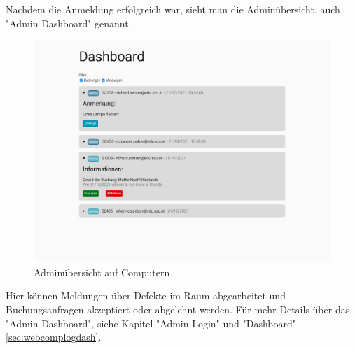 Nachdem die Anmeldung erfolgreich war, sieht man die Adminübersicht, auch "Admin Dashboard" genannt.

\begin{figure}[H]
    \centering
    \includegraphics[width=120mm]{media/WebComponents/AdminSeite_light.png}
    \caption{Adminübersicht auf Computern}
\end{figure}

Hier können Meldungen über Defekte im Raum abgearbeitet und Buchungsanfragen akzeptiert oder abgelehnt werden.
Für mehr Details über das "Admin Dashboard", siehe Kapitel "Admin Login" und "Dashboard" \ref{sec:webcomplogdash}.
